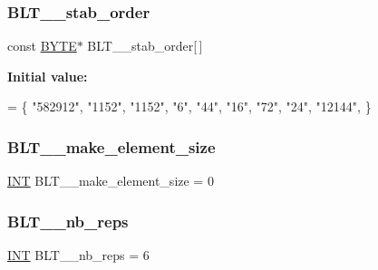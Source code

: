 \subsubsection{\texorpdfstring{B\+L\+T\+\_\+\_\+stab\+\_\+order}{BLT\_23\_stab\_order}}
{\footnotesize\ttfamily const \mbox{\hyperlink{galois_8h_ab6cc7b4aeb6ea31aba2b3fbfc83ff5e6}{B\+Y\+TE}}$\ast$ B\+L\+T\+\_\+\_\+stab\+\_\+order\mbox{[}$\,$\mbox{]}}

{\bfseries Initial value\+:}
\begin{DoxyCode}
= \{
\textcolor{stringliteral}{"582912"},
\textcolor{stringliteral}{"1152"},
\textcolor{stringliteral}{"1152"},
\textcolor{stringliteral}{"6"},
\textcolor{stringliteral}{"44"},
\textcolor{stringliteral}{"16"},
\textcolor{stringliteral}{"72"},
\textcolor{stringliteral}{"24"},
\textcolor{stringliteral}{"12144"},
\}
\end{DoxyCode}
\mbox{\label{data___b_l_t_8_c_a63a2ec5679d1c93f6ec561f5f782414e}} 
\subsubsection{\texorpdfstring{B\+L\+T\+\_\+\_\+make\+\_\+element\+\_\+size}{BLT\_25\_make\_element\_size}}
{\footnotesize\ttfamily \mbox{\hyperlink{galois_8h_a09fddde158a3a20bd2dcadb609de11dc}{I\+NT}} B\+L\+T\+\_\+\_\+make\+\_\+element\+\_\+size = 0}

\mbox{\label{data___b_l_t_8_c_ac890967b94ac99343a30aa25ed743b7d}} 
\subsubsection{\texorpdfstring{B\+L\+T\+\_\+\_\+nb\+\_\+reps}{BLT\_25\_nb\_reps}}
{\footnotesize\ttfamily \mbox{\hyperlink{galois_8h_a09fddde158a3a20bd2dcadb609de11dc}{I\+NT}} B\+L\+T\+\_\+\_\+nb\+\_\+reps = 6}

